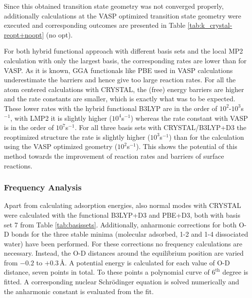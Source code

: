 \documentclass[11pt,DIV=13,BCOR=5mm,a4paper,headinclude]{scrbook}
\newcommand\todo[1]{\textcolor{red}{TODO: \textit{{#1}}}}
\begin{document}
Since this obtained transition state geometry was not converged properly, additionally calculations at the VASP optimized transition state geometry were executed and corresponding  outcomes are presented in Table \ref{tab:k_crystal-reopt+noopt} (no opt).


For both hybrid functional approach with different basis sets and the local MP2 calculation with only the largest basis, the corresponding rates are lower than for VASP.
As it is known, GGA functionals like PBE used in VASP calculations underestimate the barriers\cite{Zhao05} and hence give too large reaction rates.
For all the atom centered calculations with CRYSTAL, the (free) energy barriers are higher and the rate constants are smaller, which is exactly what was to be expected.
These lower rates with the hybrid functional B3LYP are in the order of $10^2$-$10^3$s$^{-1}$, with LMP2 it is slightly higher ($10^4$s$^{-1}$) whereas the rate constant with VASP is in the order of $10^7$s$^{-1}$. 
For all three basis sets with CRYSTAL/B3LYP+D3 the reoptimized structure the rate is slightly higher ($10^3$s$^{-1}$) than for the calculation using the VASP optimized geometry ($10^2$s$^{-1}$).
This shows the potential of this method towards the improvement of reaction rates and barriers of surface reactions.


\subsubsection{Frequency Analysis}
Apart from calculating adsorption energies, also normal modes with CRYSTAL were calculated with the functional B3LYP+D3 and PBE+D3, both with basis set 7 from Table \ref{tab:basissets}.
Additionally, anharmonic corrections for both O-D bonds for the three stable minima (molecular adsorbed, 1-2 and 1-4 dissociated water) have been performed.
For these corrections no frequency calculations are necessary.
Instead, the O-D distances around the equilibrium position are varied from $-0.2$ to $+0.3\,$\AA{}.
A potential energy is calculated for each value of O-D distance, seven points in total.
To these points a polynomial curve of $6^\textrm{th}$ degree is fitted.
A corresponding nuclear Schrödinger equation is solved numerically and the anharmonic constant is evaluated from the fit.
\end{document}
